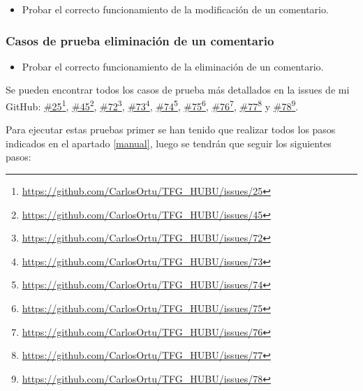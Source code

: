 \begin{itemize}
    \item Probar el correcto funcionamiento de la modificación de un comentario.
\end{itemize}

\subsubsection{Casos de prueba eliminación de un comentario}

\begin{itemize}
    \item Probar el correcto funcionamiento de la eliminación de un comentario.
\end{itemize}

Se pueden encontrar todos los casos de prueba más detallados en la issues de mi GitHub: \href{https://github.com/CarlosOrtu/TFG_HUBU/issues/25}{\#25}\footnote{\href{https://github.com/CarlosOrtu/TFG_HUBU/issues/25}{https://github.com/CarlosOrtu/TFG\_HUBU/issues/25}}, 
\href{https://github.com/CarlosOrtu/TFG_HUBU/issues/45}{\#45}\footnote{\href{https://github.com/CarlosOrtu/TFG_HUBU/issues/45}{https://github.com/CarlosOrtu/TFG\_HUBU/issues/45}}, 
\href{https://github.com/CarlosOrtu/TFG_HUBU/issues/72}{\#72}\footnote{\href{https://github.com/CarlosOrtu/TFG_HUBU/issues/72}{https://github.com/CarlosOrtu/TFG\_HUBU/issues/72}}, \href{https://github.com/CarlosOrtu/TFG_HUBU/issues/73}{\#73}\footnote{\href{https://github.com/CarlosOrtu/TFG_HUBU/issues/73}{https://github.com/CarlosOrtu/TFG\_HUBU/issues/73}}, 
\href{https://github.com/CarlosOrtu/TFG_HUBU/issues/74}{\#74}\footnote{\href{https://github.com/CarlosOrtu/TFG_HUBU/issues/74}{https://github.com/CarlosOrtu/TFG\_HUBU/issues/74}}, \href{https://github.com/CarlosOrtu/TFG_HUBU/issues/75}{\#75}\footnote{\href{https://github.com/CarlosOrtu/TFG_HUBU/issues/75}{https://github.com/CarlosOrtu/TFG\_HUBU/issues/75}}, 
\href{https://github.com/CarlosOrtu/TFG_HUBU/issues/76}{\#76}\footnote{\href{https://github.com/CarlosOrtu/TFG_HUBU/issues/76}{https://github.com/CarlosOrtu/TFG\_HUBU/issues/76}}, \href{https://github.com/CarlosOrtu/TFG_HUBU/issues/77}{\#77}\footnote{\href{https://github.com/CarlosOrtu/TFG_HUBU/issues/77}{https://github.com/CarlosOrtu/TFG\_HUBU/issues/77}} y 
\href{https://github.com/CarlosOrtu/TFG_HUBU/issues/78}{\#78}\footnote{\href{https://github.com/CarlosOrtu/TFG_HUBU/issues/78}{https://github.com/CarlosOrtu/TFG\_HUBU/issues/78}}.

Para ejecutar estas pruebas primer se han tenido que realizar todos los pasos indicados en el apartado \ref{manual}, luego se tendrán que seguir los siguientes pasos:

